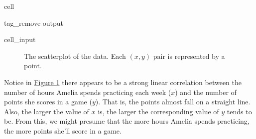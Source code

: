 \documentclass[letterpaper,10pt,english]{jupyterBook}
\begin{document}
\begin{sphinxuseclass}{cell}
\begin{sphinxuseclass}{tag_remove-output}\begin{sphinxVerbatimInput}

\begin{sphinxuseclass}{cell_input}
\begin{sphinxVerbatim}[commandchars=\\\{\}]

\end{sphinxVerbatim}

\end{sphinxuseclass}\end{sphinxVerbatimInput}

\end{sphinxuseclass}
\end{sphinxuseclass}
\begin{figure}[htbp]
\centering
\capstart

\noindent{}
\caption{The scatterplot of the data. Each \((x, y)\) pair is represented by a point.}\label{\detokenize{Ch8 Correlation and Linear Regression/8.1 Scatter Plots:scatterplot1}}\end{figure}

\sphinxAtStartPar
Notice in \hyperref[\detokenize{Ch8 Correlation and Linear Regression/8.1 Scatter Plots:scatterplot1}]{Figure \ref{\detokenize{Ch8 Correlation and Linear Regression/8.1 Scatter Plots:scatterplot1}}} there appears to be a strong linear correlation between the number of hours Amelia spends practicing each week (\(x\)) and the number of points she scores in a game (\(y\)). That is, the points almost fall on a straight line. Also, the larger the value of \(x\) is, the larger the corresponding value of \(y\) tends to be. From this, we might presume that the more hours Amelia spends practicing, the more points she’ll score in a game.
\end{document}
